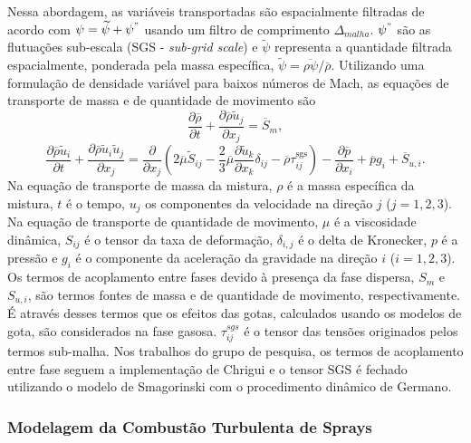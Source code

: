 Nessa abordagem, as variáveis transportadas são espacialmente filtradas de acordo com $\psi = \widetilde\psi + \psi^"$ usando um filtro de comprimento $\Delta_{malha}$. $\psi^"$ são as flutuações sub-escala (SGS - \emph{sub-grid scale}) e $\widetilde\psi$ representa a quantidade filtrada espacialmente, ponderada pela massa específica, $\widetilde\psi = \overline{\rho\psi}/\overline\rho$.
Utilizando uma formulação de densidade variável para baixos números de Mach, as equações de transporte de massa e de quantidade de movimento são
\begin{equation}
    \frac{\partial \overline \rho}{\partial t} + 
    \frac{\partial \overline \rho \widetilde u_j}{\partial x_j} = 
    \overline S_m,
\end{equation}
\begin{equation}
    \frac{\partial \overline\rho \widetilde u_i}{\partial t} + 
    \frac{\partial \overline\rho \widetilde u_i \widetilde u_j}{\partial x_j} =
    \frac{\partial }{\partial x_j} \left(
        2\overline\mu \widetilde S_{ij} -
        \frac{2}{3}\overline\mu \frac{\partial \widetilde u_k}{\partial x_k} \delta_{ij} -
        \overline\rho \tau_{ij}^{\text{sgs}}
    \right) -
    \frac{\partial \overline p}{\partial x_i} +
    \overline p g_i + 
    \overline S_{u,i}.
\end{equation}
Na equação de transporte de massa da mistura, $\rho$ é a massa específica da mistura, $t$ é o tempo, $u_j$ os componentes da velocidade na direção $j$ ($j=1,2,3$).
Na equação de transporte de quantidade de movimento, $\mu$ é a viscosidade dinâmica, $S_{ij}$ é o tensor da taxa de deformação, $\delta_{i,j}$ é o delta de Kronecker, $p$ é a pressão e $g_i$ é o componente da aceleração da gravidade na direção	$i$ ($i=1,2,3$). 
Os termos de acoplamento entre fases devido à presença da fase dispersa, $S_m$ e $S_{u,i}$,  são termos fontes de massa e de quantidade de movimento, respectivamente.
É através desses termos que os efeitos das gotas, calculados usando os modelos de gota, são considerados na fase gasosa.
$\tau_{ij}^{sgs}$ é o tensor das tensões originados pelos termos sub-malha.
Nos trabalhos do grupo de pesquisa, os termos de acoplamento entre fase seguem a implementação de Chrigui\etal{} \cite{ChriguiM2012} e o tensor SGS é fechado utilizando o modelo de Smagorinski \cite{Pope2000} com o procedimento dinâmico de Germano\etal \cite{Germano1991}.


\subsubsection{Modelagem da Combustão Turbulenta de Sprays} \label{sec:comb-sprays}

